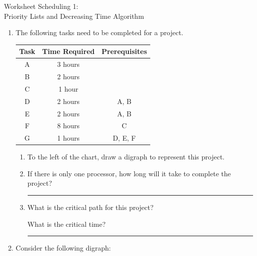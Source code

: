 \documentclass[12pt]{article}
\newcommand{\ans}[1][1in]{\rule{#1}{.5pt}}
\newcommand{\be}{\begin{enumerate}}
\newcommand{\ee}{\end{enumerate}}
\begin{document}
\begin{center}
{\Large  Worksheet Scheduling 1: \\Priority Lists and Decreasing Time Algorithm}
\end{center}



\begin{enumerate}

\item The following tasks need to be completed for a project.

    \begin{tabular}{|c|c|c|}
      \hline
      {\bf Task} & {\bf Time Required} & {\bf Prerequisites} \\
      \hline
      A & 3 hours &  \\
      \hline
      B & 2 hours & \\
      \hline
      C & 1 hour & \\
      \hline
      D & 2 hours & A, B \\
      \hline
      E & 2 hours & A, B \\
      \hline
      F & 8 hours & C \\
      \hline
      G & 1 hours & D, E, F \\
      \hline
    \end{tabular}
  \be
  \item
 To the left of the chart, draw a digraph to represent this project.
    \item If there is only one processor, how long will it take to complete the project? \ans
    
    \item  What is the critical path for this project? \hrulefill 

What is the critical time? \ans
   
\ee
\item Consider the following digraph:

\newcommand{\mydigraph}{\begin{tikzpicture}[vtx/.style={draw, circle, inner sep = 3pt, font = \scriptsize}, myto/.style={-latex, shorten >=2pt, shorten <=2pt
}, node distance = \r cm]
\node[vtx, label=above:{\scriptsize $A(10)$}, ] (T1) at (0,0){};
\node[vtx, right =of T1, label=above:{\scriptsize $B(7)$}] (T2) {};
\node[vtx, right =of T2, label=above:{\scriptsize $C(4)$}] (T3) {};
\node[vtx, below = \s cm of T1, label=above:{\scriptsize $D(9)$}] (T4) {};
\node[vtx, right =of T4, label=above left:{\scriptsize $E(5)$}] (T5) {};
\node[vtx, right =of T5, label= right:{\scriptsize $F(4)$}] (T6) {};
\node[vtx, below =\s cm of T4, label=below:{\scriptsize $G(13)$}] (T7) {};
\node[vtx, right =of T7, label=below:{\scriptsize $H(4)$}] (T8) {};
\node[vtx, right =of T8, label=below:{\scriptsize $I(6)$}] (T9) {};


\end{tikzpicture}}
\end{enumerate}
\end{document}
